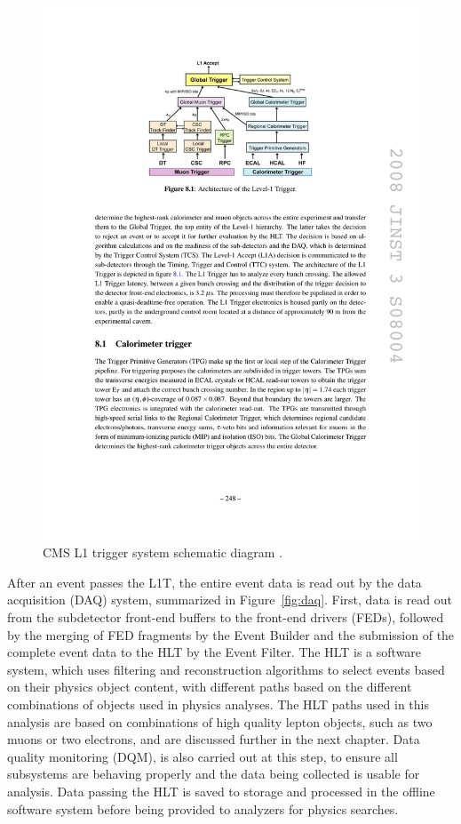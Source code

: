 \begin{figure}[tbh]
\centering
\includegraphics[width=5in]{figures/l1t.pdf}
\caption{CMS L1 trigger system schematic diagram \cite{1748-0221-3-08-S08004}.}
\label{fig:l1t}
\end{figure}

\indent After an event passes the L1T, the entire event data is read out by the data acquisition (DAQ) system, summarized in Figure~\ref{fig:daq}. First, data is read out from the subdetector front-end buffers to the front-end drivers (FEDs), followed by the merging of FED fragments by the Event Builder and the submission of the complete event data to the HLT by the Event Filter. The HLT is a software system, which uses filtering and reconstruction algorithms to select events based on their physics object content, with different paths based on the different combinations of objects used in physics analyses. The HLT paths used in this analysis are based on combinations of high quality lepton objects, such as two muons or two electrons, and are discussed further in the next chapter. Data quality monitoring (DQM), is also carried out at this step, to ensure all subsystems are behaving properly and the data being collected is usable for analysis. Data passing the HLT is saved to storage and processed in the offline software system before being provided to analyzers for physics searches. 

